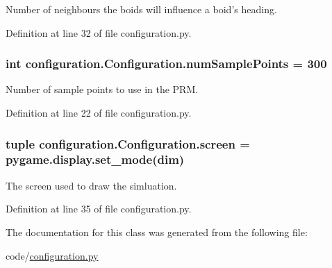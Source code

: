 Number of neighbours the boids will influence a boid's heading. 



Definition at line 32 of file configuration.\-py.

\hypertarget{classconfiguration_1_1Configuration_a35685f1f81ce810f4a429654c6b27334}{
\subsubsection[{num\-Sample\-Points}]{\setlength{\rightskip}{0pt plus 5cm}int configuration.\-Configuration.\-num\-Sample\-Points = 300\hspace{0.3cm}{\ttfamily [static]}}}\label{classconfiguration_1_1Configuration_a35685f1f81ce810f4a429654c6b27334}


Number of sample points to use in the P\-R\-M. 



Definition at line 22 of file configuration.\-py.

\hypertarget{classconfiguration_1_1Configuration_a04b8c98906296ee65625d1472e037a75}{
\subsubsection[{screen}]{\setlength{\rightskip}{0pt plus 5cm}tuple configuration.\-Configuration.\-screen = pygame.\-display.\-set\-\_\-mode({\bf dim})\hspace{0.3cm}{\ttfamily [static]}}}\label{classconfiguration_1_1Configuration_a04b8c98906296ee65625d1472e037a75}


The screen used to draw the simluation. 



Definition at line 35 of file configuration.\-py.



The documentation for this class was generated from the following file\-:\begin{DoxyCompactItemize}
\item 
code/\hyperlink{configuration_8py}{configuration.\-py}\end{DoxyCompactItemize}
